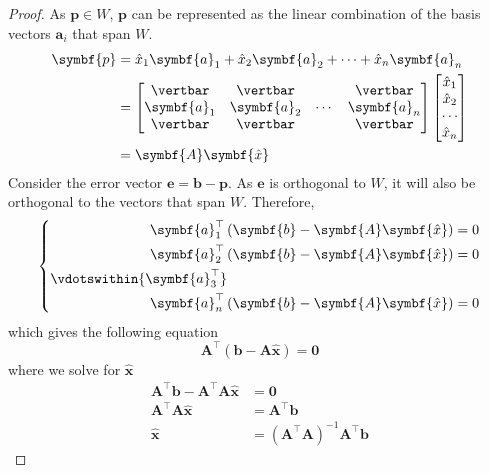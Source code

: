 \documentclass{article}
\begin{document}
\begin{proof}
    As \(\symbf{p}\in W\), \(\symbf{p}\) can be represented as the
    linear combination of the basis vectors \(\symbf{a}_i\) that span
    \(W\).
    \begin{align*}
        \symbf{p} & = \hat{x}_1 \symbf{a}_1 + \hat{x}_2 \symbf{a}_2 + \cdots + \hat{x}_n \symbf{a}_n \\
                  & =
        \begin{bmatrix}
            \vertbar    & \vertbar    &        & \vertbar    \\
            \symbf{a}_1 & \symbf{a}_2 & \cdots & \symbf{a}_n \\
            \vertbar    & \vertbar    &        & \vertbar
        \end{bmatrix}
        \begin{bmatrix}
            \hat{x}_1 \\
            \hat{x}_2 \\
            \cdots    \\
            \hat{x}_n
        \end{bmatrix}
        \\
                  & = \symbf{A}\symbf{\hat{x}}
    \end{align*}
    Consider the error vector \(\symbf{e}=\symbf{b}-\symbf{p}\).
    As \(\symbf{e}\) is orthogonal to \(W\), it will also be
    orthogonal to the vectors that span \(W\). Therefore,
    \begin{equation*}
        \left\{
        \begin{aligned}
            \symbf{a}_1^\top\left( \symbf{b}-\symbf{A}\symbf{\hat{x}} \right)                         & = 0 \\
            \symbf{a}_2^\top\left( \symbf{b}-\symbf{A}\symbf{\hat{x}} \right)                         & = 0 \\
            \vdotswithin{\symbf{a}_3^\top}\phantom{\left( \symbf{b}-\symbf{A}\symbf{\hat{x}} \right)} &     \\
            \symbf{a}_n^\top\left( \symbf{b}-\symbf{A}\symbf{\hat{x}} \right)                         & = 0
        \end{aligned}
        \right.
    \end{equation*}
    which gives the following equation
    \begin{equation*}
        \symbf{A}^\top \left( \symbf{b}-\symbf{A}\symbf{\hat{x}} \right) = \symbf{0}
    \end{equation*}
    where we solve for \(\symbf{\hat{x}}\)
    \begin{align*}
        \symbf{A}^\top \symbf{b}-\symbf{A}^\top \symbf{A}\symbf{\hat{x}} & = \symbf{0}                                                            \\
        \symbf{A}^\top \symbf{A}\symbf{\hat{x}}                          & = \symbf{A}^\top \symbf{b}                                             \\
        \symbf{\hat{x}}                                                  & = \left( \symbf{A}^\top \symbf{A} \right)^{-1}\symbf{A}^\top \symbf{b}
    \end{align*}
\end{proof}
\end{document}
